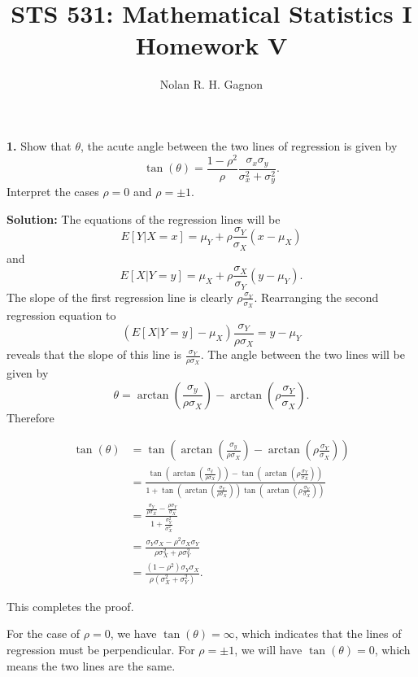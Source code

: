 \documentclass{article}
\title{STS 531:  Mathematical Statistics I \\
	   \textbf{Homework V}}
\author{Nolan R. H. Gagnon}
\newcommand{\mybox}{%
    \collectbox{%
        \setlength{\fboxsep}{1pt}%
        \fbox{\BOXCONTENT}%
    }%
}
\begin{document}
\maketitle

\noindent\mybox{\textbf{1.}}  Show that $\theta$, the acute angle between the two lines of regression is given by $$\tan(\theta)=\frac{1-\rho^2}{\rho}\frac{\sigma_x\sigma_y}{\sigma_x^2+\sigma_y^2}.$$  Interpret the cases $\rho = 0$ and $\rho = \pm 1$.  


\vspace{5mm}

\noindent\mybox{\textbf{Solution:}}  The equations of the regression lines will be $$E[Y|X=x] = \mu_Y + \rho\frac{\sigma_Y}{\sigma_X}(x-\mu_X)$$ and $$E[X|Y=y] = \mu_X + \rho\frac{\sigma_X}{\sigma_Y}(y-\mu_Y).$$  The slope of the first regression line is clearly $\rho\frac{\sigma_Y}{\sigma_X}$.  Rearranging the second regression equation to $$(E[X|Y=y]-\mu_X)\frac{\sigma_Y}{\rho\sigma_X} = y - \mu_Y$$ reveals that the slope of this line is $\frac{\sigma_Y}{\rho\sigma_X}$.  The angle between the two lines will be given by $$\theta = \arctan\left(\frac{\sigma_y}{\rho\sigma_X}\right) - \arctan\left(\rho\frac{\sigma_Y}{\sigma_X}\right).$$  Therefore

\pagebreak

\begin{align}
\tan(\theta) &= \tan\left(\arctan\left(\frac{\sigma_y}{\rho\sigma_X}\right) - \arctan\left(\rho\frac{\sigma_Y}{\sigma_X}\right)\right) \\
&= \frac{\tan\left(\arctan\left(\frac{\sigma_y}{\rho\sigma_X}\right) \right)- \tan\left( \arctan\left(\rho\frac{\sigma_Y}{\sigma_X}\right)\right)}{1+\tan\left(\arctan\left(\frac{\sigma_Y}{\rho\sigma_X}\right)\right)\tan\left(\arctan\left(\rho\frac{\sigma_Y}{\sigma_X}\right)\right)} \\
&= \frac{\frac{\sigma_Y}{\rho\sigma_X}- \frac{\rho\sigma_Y}{\sigma_X}}{1+\frac{\sigma_Y^2}{\sigma_X^2}} \\
&= \frac{\sigma_Y\sigma_X - \rho^2\sigma_X\sigma_Y}{\rho\sigma_X^2+\rho\sigma_Y^2} \\
&= \frac{(1-\rho^2)\sigma_Y\sigma_X}{\rho(\sigma_X^2+\sigma_Y^2)}.
\end{align}

\noindent This completes the proof.

\vspace{3mm}

\noindent For the case of $\rho = 0$, we have $\tan(\theta) = \infty$, which indicates that the lines of regression must be perpendicular.  For $\rho = \pm 1$, we will have $\tan(\theta) = 0$, which means the two lines are the same.
\end{document}
